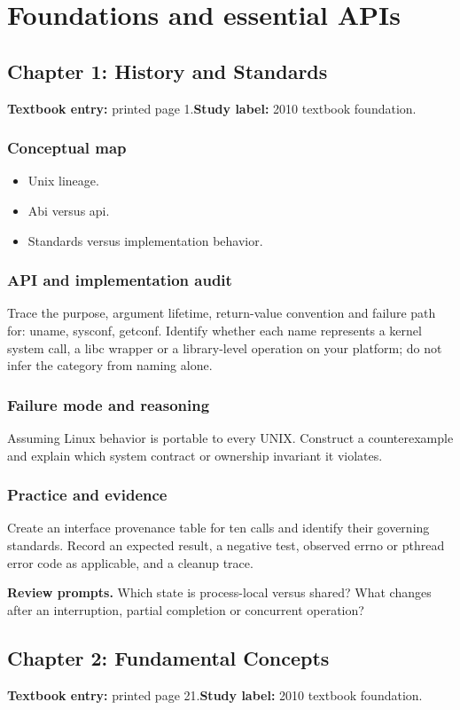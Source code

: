 \documentclass[11pt,letterpaper,oneside]{report}
\begin{document}
\chapter{Foundations and essential APIs}
\section{Chapter 1: History and Standards}
\textbf{Textbook entry:} printed page 1.\quad \textbf{Study label:} 2010 textbook foundation.

\subsection{Conceptual map}
\begin{itemize}
\item Unix lineage.
\item Abi versus api.
\item Standards versus implementation behavior.
\end{itemize}
\subsection{API and implementation audit}
Trace the purpose, argument lifetime, return-value convention and failure path for: uname, sysconf, getconf. Identify whether each name represents a kernel system call, a libc wrapper or a library-level operation on your platform; do not infer the category from naming alone.

\subsection{Failure mode and reasoning}
Assuming Linux behavior is portable to every UNIX. Construct a counterexample and explain which system contract or ownership invariant it violates.

\subsection{Practice and evidence}
Create an interface provenance table for ten calls and identify their governing standards. Record an expected result, a negative test, observed errno or pthread error code as applicable, and a cleanup trace.

\textbf{Review prompts.} Which state is process-local versus shared? What changes after an interruption, partial completion or concurrent operation?

\section{Chapter 2: Fundamental Concepts}
\textbf{Textbook entry:} printed page 21.\quad \textbf{Study label:} 2010 textbook foundation.
\end{document}
